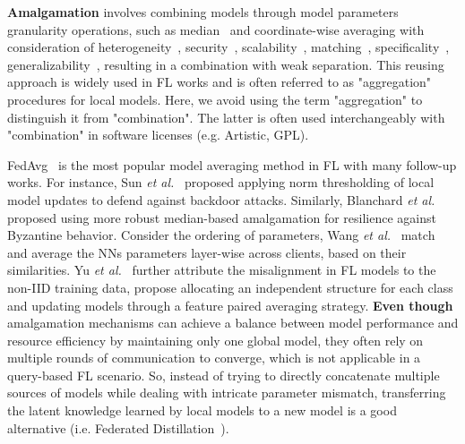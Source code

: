 \textbf{Amalgamation} involves combining models through model parameters granularity operations, such as median~\cite{blanchard2017machine, pillutla2022robust} and coordinate-wise averaging with consideration of heterogeneity~\cite{mcmahan2017communication, li2018federated}, security~\cite{sun2019can}, scalability~\cite{reisizadeh2020fedpaq}, matching~\cite{wang2020federated, yu2021fed2}, specificality~\cite{gudur2020resource}, generalizability~\cite{qu2022generalized}, resulting in a combination with weak separation.
This reusing approach is widely used in FL works and is often referred to as "aggregation" procedures for local models.
Here, we avoid using the term "aggregation" to distinguish it from "combination". The latter is often used interchangeably with "combination" in software licenses (e.g. Artistic, GPL).

FedAvg~\cite{mcmahan2017communication} is the most popular model averaging method in FL with many follow-up works. 
For instance, Sun \textit{et al.}~\cite{sun2019can} proposed applying norm thresholding of local model updates to defend against backdoor attacks.
Similarly, Blanchard \textit{et al.}~\cite{blanchard2017machine} proposed using more robust median-based amalgamation for resilience against Byzantine behavior.
Consider the ordering of parameters, Wang \textit{et al.}~\cite{wang2020federated} match and average the NNs parameters layer-wise across clients, based on their similarities.
Yu \textit{et al.}~\cite{yu2021fed2} further attribute the misalignment in FL models to the non-IID training data, propose allocating an independent structure for each class and updating models through a feature paired averaging strategy.
\textbf{Even though} amalgamation mechanisms can achieve a balance between model performance and resource efficiency by maintaining only one global model, they often rely on multiple rounds of communication to converge, which is not applicable in a query-based FL scenario.
So, instead of trying to directly concatenate multiple sources of models while dealing with intricate parameter mismatch, transferring the latent knowledge learned by local models to a new model is a good alternative (i.e. Federated Distillation~\cite{jeong2018communication, jin2023feddyn}).


